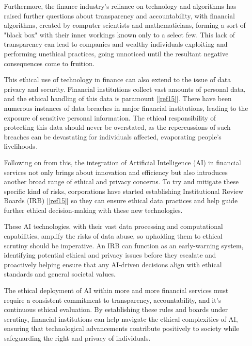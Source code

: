 \documentclass{article}
\begin{document}
Furthermore, the finance industry's reliance on technology and algorithms has raised further questions about transparency and accountability, with financial algorithms, created by computer scientists and mathematicians, forming a sort of "black box" with their inner workings known only to a select few. This lack of transparency can lead to companies and wealthy individuals exploiting and performing unethical practices, going unnoticed until the resultant negative consequences come to fruition.\\\vspace{0.3cm}

This ethical use of technology in finance can also extend to the issue of data privacy and security. Financial institutions collect vast amounts of personal data, and the ethical handling of this data is paramount [\ref{ref15}]. There have been numerous instances of data breaches in major financial institutions, leading to the exposure of sensitive personal information. The ethical responsibility of protecting this data should never be overstated, as the repercussions of such breaches can be devastating for individuals affected, evaporating people's livelihoods.\\\vspace{0.3cm}

Following on from this, the integration of Artificial Intelligence (AI) in financial services not only brings about innovation and efficiency but also introduces another broad range of ethical and privacy concerns. To try and mitigate these specific kind of risks, corporations have started establishing Institutional Review Boards (IRB) [\ref{ref15}] so they can ensure ethical data practices and help guide further ethical decision-making with these new technologies.\\\vspace{0.3cm}

These AI technologies, with their vast data processing and computational capabilities, amplify the risks of data abuse, so upholding them to ethical scrutiny should be imperative. An IRB can function as an early-warning system, identifying potential ethical and privacy issues before they escalate and proactively helping ensure that any AI-driven decisions align with ethical standards and general societal values.\\\vspace{0.3cm}

The ethical deployment of AI within more and more financial services must require a consistent commitment to transparency, accountability, and it's continuous ethical evaluation. By establishing these rules and boards under scrutiny, financial institutions can help navigate the ethical complexities of AI, ensuring that technological advancements contribute positively to society while safeguarding the right and privacy of individuals.\\\vspace{0.3cm}
\end{document}
